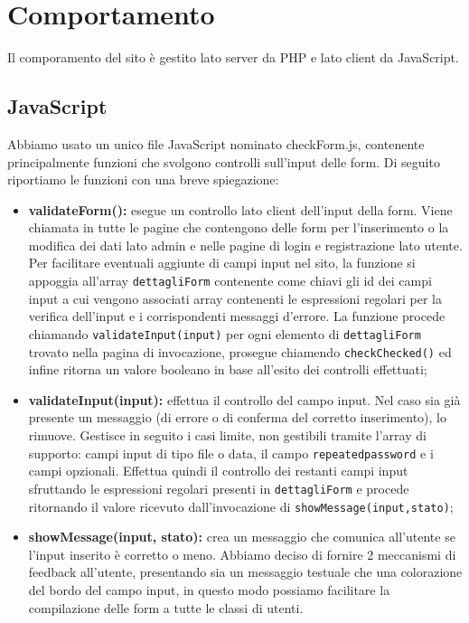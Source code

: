 \section{Comportamento}
Il comporamento del sito è gestito lato server da PHP e lato client da JavaScript.

\subsection{JavaScript}
Abbiamo usato un unico file JavaScript nominato checkForm.js, contenente principalmente funzioni che svolgono controlli sull'input delle form.
Di seguito riportiamo le funzioni con una breve spiegazione:

\begin{itemize}
	\item \textbf{validateForm(): } esegue un controllo lato client dell'input della form. Viene chiamata in tutte le pagine che contengono delle form per l'inserimento o la modifica dei dati lato admin e nelle pagine di login e registrazione lato utente.
	Per facilitare eventuali aggiunte di campi input nel sito, la funzione si appoggia all'array \texttt{dettagliForm} contenente come chiavi gli id dei campi input a cui vengono associati array contenenti le espressioni regolari per la verifica dell'input e i corrispondenti messaggi d'errore.
	La funzione procede chiamando \texttt{validateInput(input)} per ogni elemento di \texttt{dettagliForm} trovato nella pagina di invocazione, prosegue chiamendo \texttt{checkChecked()} ed infine ritorna un valore booleano in base all'esito dei controlli effettuati; \\

	\item \textbf{validateInput(input): } effettua il controllo del campo input. Nel caso sia già presente un messaggio (di errore o di conferma del corretto inserimento), lo rimuove. Gestisce in seguito i casi limite, non gestibili tramite l'array di supporto: campi input di tipo file o data, il campo \texttt{repeatedpassword} e i campi opzionali. Effettua quindi il controllo dei restanti campi input sfruttando le espressioni regolari presenti in \texttt{dettagliForm} e procede ritornando il valore ricevuto dall'invocazione di \texttt{showMessage(input,stato)}; \\

	\item \textbf{showMessage(input, stato): } crea un messaggio che comunica all'utente se l'input inserito è corretto o meno. Abbiamo deciso di fornire 2 meccanismi di feedback all'utente, presentando sia un messaggio testuale che una colorazione del bordo del campo input, in questo modo possiamo facilitare la compilazione delle form a tutte le classi di utenti. \\


\end{itemize}
